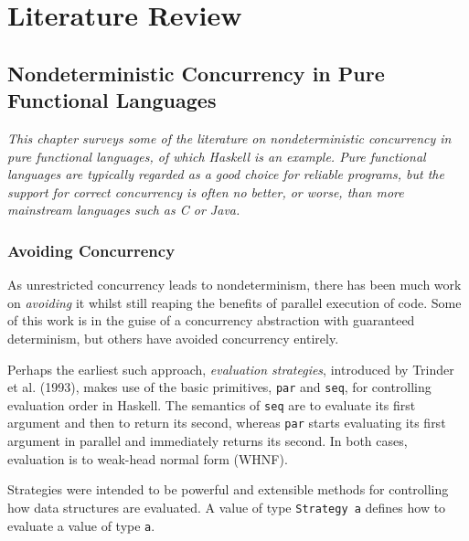 \part{Literature Review}


\chapter{Nondeterministic Concurrency in Pure Functional Languages}
\label{chp:litrev}

\textit{This chapter surveys some of the literature on
  nondeterministic concurrency in pure functional languages, of which
  Haskell is an example. Pure functional languages are typically regarded
  as a good choice for reliable programs, but the support for correct
  concurrency is often no better, or worse, than more mainstream
  languages such as C or Java.}

\section{Avoiding Concurrency}
\label{sec:litrev-strategies}

As unrestricted concurrency leads to nondeterminism, there has been
much work on \textit{avoiding} it whilst still reaping the benefits of
parallel execution of code. Some of this work is in the guise of a
concurrency abstraction with guaranteed determinism, but others have
avoided concurrency entirely.

Perhaps the earliest such approach, \textit{evaluation strategies},
introduced by Trinder et al. (1993)\nocite{trinder}, makes use of the
basic primitives, \verb|par| and \verb|seq|, for controlling
evaluation order in Haskell. The semantics of \verb|seq| are to
evaluate its first argument and then to return its second, whereas
\verb|par| starts evaluating its first argument in parallel and
immediately returns its second. In both cases, evaluation is to
weak-head normal form (WHNF).

Strategies were intended to be powerful and extensible methods for
controlling how data structures are evaluated. A value of type
\verb|Strategy a| defines how to evaluate a value of type
\verb|a|.

